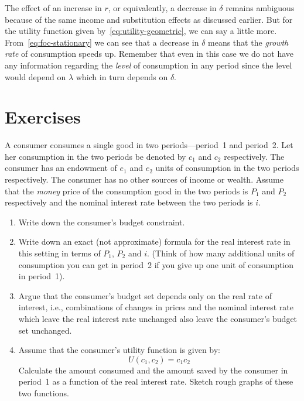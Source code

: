 \documentclass[11pt,reqno,openany]{amsbook}
\begin{document}
The effect of an increase in $r$, or equivalently, a decrease in
$\delta$ remains ambiguous because of the same income and substitution
effects as discussed earlier. But for the utility function given
by~\eqref{eq:utility-geometric}, we can say a little
more. From~\eqref{eq:foc-stationary} we can see that a decrease in
$\delta$ means that the \emph{growth rate} of consumption speeds
up. Remember that even in this case we do not have any information
regarding the \emph{level} of consumption in any period since the
level would depend on $\lambda$ which in turn depends on
$\delta$.

\section*{Exercises}
\begin{exercises}
  \item A consumer consumes a single good in two
  periods---period~1 and period~2. Let her consumption in the two
  periods be denoted by $c_1$ and $c_2$ respectively. The consumer has
  an endowment of $e_1$ and $e_2$ units of consumption in the two
  periods respectively. The consumer has no other sources of income or
  wealth. Assume that the \emph{money} price of the consumption good
  in the two periods is $P_1$ and $P_2$ respectively and the nominal
  interest rate between the two periods is $i$.
  \begin{enumerate}
    \item Write down the consumer's budget constraint. 

    \item Write down an exact (not approximate) formula for the real
    interest rate in this setting in terms of $P_1$, $P_2$ and
    $i$. (Think of how many additional units of consumption you can
    get in period~2 if you give up one unit of consumption in
    period~1).

    \item Argue that the consumer's budget set depends only on the
    real rate of interest, i.e., combinations of changes in prices and
    the nominal interest rate which leave the real interest rate
    unchanged also leave the consumer's budget set unchanged.

    \item Assume that the consumer's utility function is given by:
    \[U(c_1,c_2) = c_1c_2\]
    Calculate the amount consumed and the amount saved by the consumer
    in period~1 as a function of the real interest rate. Sketch rough
    graphs of these two functions.
  \end{enumerate}
  

\end{exercises}
\end{document}
